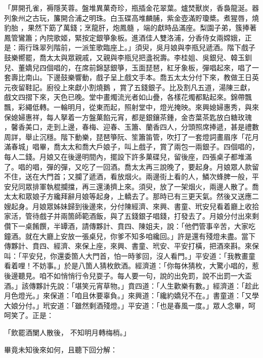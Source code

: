 「屏開孔雀，褥隱芙蓉。盤堆異菓奇珍，瓶插金花翠葉。爐焚獸炭，香裊龍涎。器列象州之古玩，簾開合浦之明珠。白玉碟高堆麟脯，紫金壺滿貯瓊槳。煮猩唇，燒豹胎 ，果然下筯了萬錢；烹龍肝，炮鳳髓 ，端的獻時品滿座。梨園子弟，簇捧著鳳管鸞簫；內院歌姬，緊按定銀箏象板。進酒佳人雙洛浦，分香侍女兩嫦娥，正是：兩行珠翠列階前，一派笙歌臨座上。」須臾，吳月娘與李瓶兒遞酒。階下戲子鼓樂嚮罷，喬太太與眾親戚，又親與李瓶兒把盞祝壽。李桂姐、吳銀兒、韓玉釧兒、董嬌兒四個唱的，在席前錦瑟銀箏，玉面琵琶，紅牙象板，彈唱起來，唱了一套壽比南山。下邊鼓樂響動，戲子呈上戲文手本。喬五太太分付下來，教做王日英元夜留鞋記。廚役上來獻小割燒鵝 ，賞了五錢銀子。比及割凡五道，湯陳三獻，戲文四摺下來，天色已晚。堂中畫燭流光者如山疊，各樣花燭都點起來。錦帶飄飄，彩繩低轉。一輪明月，從東而起，照射堂中，燈光掩映。來興媳婦惠秀，與來保媳婦惠祥，每人拏着一方盤菓餡元宵，都是銀鑲茶鍾，金杏葉茶匙放白糖玫瑰 ，馨香美口，走到上邊，春梅、迎春、玉簫、蘭香四人，分頭照席捧遞，甚是禮數周詳，舉止沉穩。階下動樂，琵琶箏阮、笙簫笛管，吹打了一套燈詞畫眉序「花月滿春城」唱畢，喬太太和喬大戶娘子，叫上戲子，賞了兩包一兩銀子。四個唱的，每人二錢。月娘又在後邊明間內，擺設下許多菓碟兒，留後座，四張桌子都堆滿了。唱的唱，彈的彈，又吃了一回酒。喬太太再三說晚了，要起身。月娘眾人款留不住，送在大門首；又攔了遞酒，看放烟火。兩邊街上看的人，鱗次蜂脾一般，平安兒同眾排軍執棍攔擋，再三還湧擠上來。須臾，放了一架烟火，兩邊人散了。喬太太和眾娘子方纔拜辭月娘等起身，上轎去了。那時已有三更天氣。然後又送應二嫂起身。月娘眾姊妹歸到後邊來，分付陳經濟、來興、書童、玳安兒看着廳上收拾家活，管待戲子并兩箇師範酒飯，與了五錢銀子唱錢，打發去了。月娘分付出來剩儹下一桌餚饌，半罈酒，請傳夥計、賁四、陳姐夫，說：「他們管事辛苦，大家吃鐘酒。就在大廳上安放一張桌兒，你爹不知多咱纔回。」許是還有殘燈未盡。當下傳夥計、賁四、經濟、來保上座，來興、書童、玳安、平安打橫，把酒來斟。來保叫：「平安兒，你還委箇人大門首，怕一時爹回，沒人看門。」平安道：「我教畫童看着哩！不妨事。」於是八箇人猜枚飲酒。經濟道：「你每休猜枚，大驚小唱的，惹後邊聽見。咱不如悄悄行令兒耍子。每人要一句，說的出免罰，說不出罰一大盃酒。」該傳夥計先說：「堪笑元宵草物。」賁四道：「人生歡樂有數。」經濟道：「趁此月色燈光。」來保道：「咱且休要辜負。」來興道：「纔約嬌兒不在。」書童道：「又學大娘分付。」玳安道：「雖然剩酒殘燈。」平安道：「也是春風一度。」眾人念畢，呵呵笑了。正是：

「飲罷酒闌人散後，  不知明月轉梅梢。」

畢竟未知後來如何，且聽下回分解：
